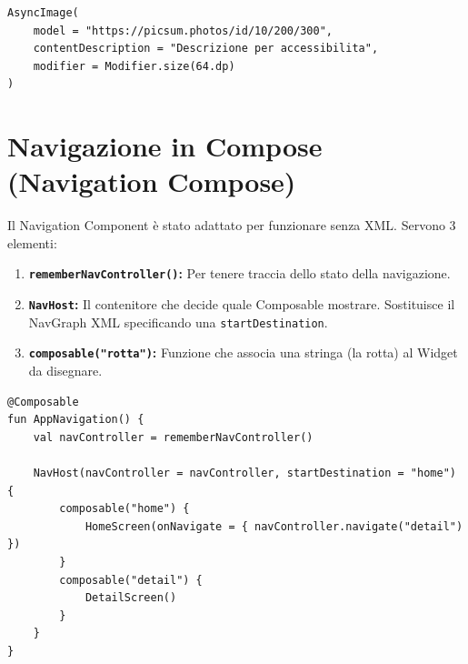 \begin{lstlisting}[caption={Esempio di AsyncImage}, label={lst:asyncimage}]
AsyncImage(
    model = "https://picsum.photos/id/10/200/300",
    contentDescription = "Descrizione per accessibilita",
    modifier = Modifier.size(64.dp)
)
\end{lstlisting}

\section{Navigazione in Compose (Navigation Compose)}
Il Navigation Component è stato adattato per funzionare senza XML.
Servono 3 elementi:
\begin{enumerate}
    \item \textbf{\texttt{rememberNavController()}:} Per tenere traccia dello stato della navigazione.
    \item \textbf{\texttt{NavHost}:} Il contenitore che decide quale Composable mostrare.
    Sostituisce il NavGraph XML specificando una \texttt{startDestination}.
    \item \textbf{\texttt{composable("rotta")}:} Funzione che associa una stringa (la rotta) al Widget da disegnare.
\end{enumerate}

\begin{lstlisting}[caption={Navigazione in Compose}, label={lst:nav_compose}]
@Composable
fun AppNavigation() {
    val navController = rememberNavController()

    NavHost(navController = navController, startDestination = "home") {
        composable("home") {
            HomeScreen(onNavigate = { navController.navigate("detail") })
        }
        composable("detail") {
            DetailScreen()
        }
    }
}
\end{lstlisting}